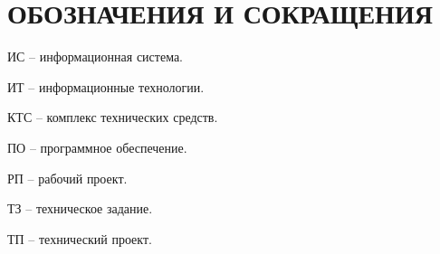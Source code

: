 \section*{ОБОЗНАЧЕНИЯ И СОКРАЩЕНИЯ}

ИС -- информационная система.

ИТ -- информационные технологии. 

КТС -- комплекс технических средств.

ПО -- программное обеспечение.

РП -- рабочий проект.

ТЗ -- техническое задание.

ТП -- технический проект.
